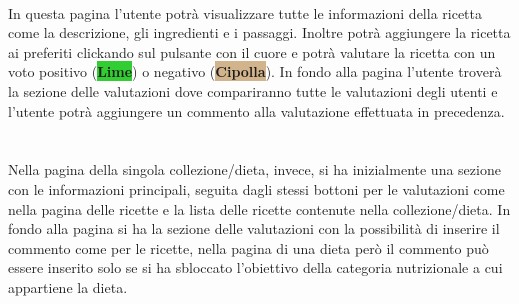 ﻿\documentclass[a4paper,12pt]{report}
\begin{document}
\\In questa pagina l'utente potrà visualizzare tutte le informazioni della ricetta come la descrizione, gli ingredienti e i passaggi.
Inoltre potrà aggiungere la ricetta ai preferiti clickando sul pulsante con il cuore e potrà valutare la ricetta con un voto positivo (\colorbox{LimeGreen}{\textbf{Lime}}) o negativo (\colorbox{Tan}{\textbf{Cipolla}}).
In fondo alla pagina l'utente troverà la sezione delle valutazioni dove compariranno tutte le valutazioni degli utenti e l'utente potrà aggiungere un commento alla valutazione effettuata in precedenza.
\\\\\\Nella pagina della singola collezione/dieta, invece, si ha inizialmente una sezione con le informazioni principali, seguita dagli stessi bottoni per le valutazioni come nella pagina delle ricette e la lista delle ricette contenute nella collezione/dieta.
In fondo alla pagina si ha la sezione delle valutazioni con la possibilità di inserire il commento come per le ricette, nella pagina di una dieta però il commento può essere inserito solo se si ha sbloccato l'obiettivo della categoria nutrizionale a cui appartiene la dieta.
\end{document}
